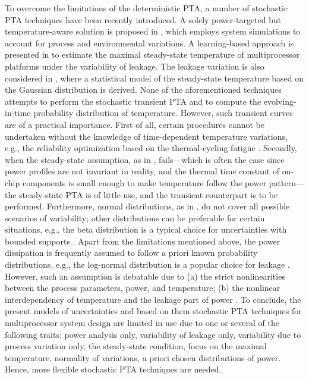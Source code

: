 To overcome the limitations of the deterministic PTA, a number of stochastic PTA techniques have been recently introduced. A solely power-targeted but temperature-aware solution is proposed in \cite{chandra2010}, which employs system simulations to account for process and environmental variations. A learning-based approach is presented in \cite{juan2011} to estimate the maximal steady-state temperature of multiprocessor platforms under the variability of leakage. The leakage variation is also considered in \cite{juan2012}, where a statistical model of the steady-state temperature based on the Gaussian distribution is derived. None of the aforementioned techniques attempts to perform the stochastic transient PTA and to compute the evolving-in-time probability distribution of temperature. However, such transient curves are of a practical importance. First of all, certain procedures cannot be undertaken without the knowledge of time-dependent temperature variations, e.g., the reliability optimization based on the thermal-cycling fatigue \cite{ukhov2012}. Secondly, when the steady-state assumption, as in \cite{juan2011, juan2012}, fails---which is often the case since power profiles are not invariant in reality, and the thermal time constant of on-chip components is small enough to make temperature follow the power pattern---the steady-state PTA is of little use, and the transient counterpart is to be performed. Furthermore, normal distributions, as in \cite{juan2012}, do not cover all possible scenarios of variability; other distributions can be preferable for certain situations, e.g., the beta distribution is a typical choice for uncertainties with bounded supports \cite{maitre2010}. Apart from the limitations mentioned above, the power dissipation is frequently assumed to follow a priori known probability distributions, e.g., the log-normal distribution is a popular choice for leakage \cite{srivastava2010}. However, such an assumption is debatable due to (a) the strict nonlinearities between the process parameters, power, and temperature; (b) the nonlinear interdependency of temperature and the leakage part of power \cite{liu2007}. To conclude, the present models of uncertainties and based on them stochastic PTA techniques for multiprocessor system design are limited in use due to one or several of the following traits: power analysis only, variability of leakage only, variability due to process variation only, the steady-state condition, focus on the maximal temperature, normality of variations, a priori chosen distributions of power. Hence, more flexible stochastic PTA techniques are needed.

